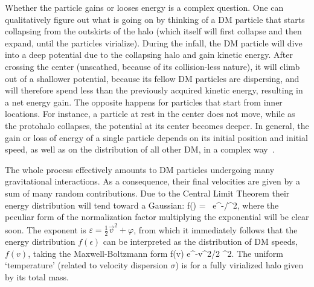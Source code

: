 Whether the particle gains or looses energy is a complex question.
One can qualitatively figure out what is going on by thinking of a DM particle that starts collapsing from the outskirts of the halo (which itself will first collapse and then expand, until the particles virialize). During the infall, the DM particle will dive into a deep potential due to the collapsing halo and gain kinetic energy. 
After crossing the center (unscathed, because of its collision-less nature), it will climb out of a shallower potential, because its fellow DM particles are dispersing, and will therefore spend less than the previously acquired kinetic energy, resulting in a net energy gain. The opposite happens for particles that start from inner locations. For instance, a particle at rest in the center does not move, while as the protohalo collapses, the potential at its center becomes deeper. In general, the gain or loss of energy of a single particle depends on its initial position and initial speed, as well as on the distribution of all other DM, in a complex way~\cite{books_galaxy_formation,Lynden-Bell1967}.

\smallskip

The whole process effectively amounts to 
DM particles undergoing many  gravitational interactions.
As a consequence, their final velocities are given by a sum of many random contributions.
Due to the Central Limit Theorem their energy distribution will tend toward 
a Gaussian:
\beq\label{eq:DMdensGauss}
f(\varepsilon) =  \ e^{-\varepsilon/\sigma^2}, 
\eeq
where the peculiar form of the normalization factor multiplying the exponential will be clear soon. 
The exponent is $\varepsilon = \frac12 \vec v^2 + \varphi$, from which it immediately  follows that the energy distribution $f(\epsilon)$ can be interpreted as the distribution of DM speeds, $f(v)$, taking the Maxwell-Boltzmann form
\beq
f(v) \propto e^{-v^2/2 \sigma^2}.
\eeq
The uniform `temperature' (related to velocity dispersion $\sigma$) is for a fully virialized halo given by its total mass. 

